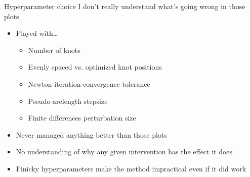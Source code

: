 \documentclass[presentation]{beamer}
\begin{document}
\begin{frame}[<+->][label={sec:org6bdcb3e}]{Hyperparameter choice}
I don't really understand what's going wrong in those plots
\vfill
\begin{itemize}
\item Played with\ldots{}
\begin{itemize}
\item Number of knots
\item Evenly spaced vs. optimized knot positions
\item Newton iteration convergence tolerance
\item Pseudo-arclength stepsize
\item Finite differences perturbation size
\end{itemize}
\end{itemize}
\vfill
\begin{itemize}
\item Never managed anything better than those plots
\end{itemize}
\vfill
\begin{itemize}
\item No understanding of why any given intervention has the effect it does
\end{itemize}
\vfill
\begin{itemize}
\item Finicky hyperparameters make the method impractical even if it did work
\end{itemize}
\end{frame}
\end{document}
